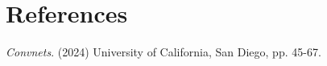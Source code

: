 \section*{References}

\medskip

{
	\small

	\begin{enumerate}[label={[\arabic*]}]
		\item \textit{Convnets}. (2024) University of California, San Diego, pp. 45-67.
	\end{enumerate}
}
